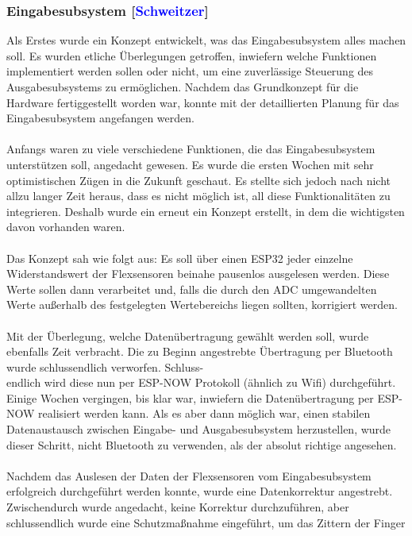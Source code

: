\documentclass[titlepage,12pt,twoside]{article}
\begin{document}
\subsubsection{Eingabesubsystem [\textcolor{blue}{Schweitzer}]}
Als Erstes wurde ein Konzept entwickelt, was das Eingabesubsystem alles machen 
soll. Es wurden etliche Überlegungen getroffen, inwiefern welche Funktionen 
implementiert werden sollen oder nicht, um eine zuverlässige Steuerung des 
Ausgabesubsystems zu ermöglichen. Nachdem das Grundkonzept für die Hardware 
fertiggestellt worden war, konnte mit der detaillierten Planung für das 
Eingabesubsystem angefangen werden. \\
\\
Anfangs waren zu viele verschiedene Funktionen, die das Eingabesubsystem 
unterstützen soll, angedacht gewesen. Es wurde die ersten Wochen mit sehr 
optimistischen Zügen in die Zukunft geschaut. Es stellte sich jedoch nach 
nicht allzu langer Zeit heraus, dass es nicht möglich ist, all diese 
Funktionalitäten zu integrieren. Deshalb wurde ein erneut ein Konzept erstellt, 
in dem die wichtigsten davon vorhanden waren. \\
\\ 
Das Konzept sah wie folgt aus: Es soll über einen ESP32 jeder einzelne 
Widerstandswert der Flexsensoren beinahe pausenlos ausgelesen werden. 
Diese Werte sollen dann verarbeitet und, falls die durch den ADC umgewandelten
Werte außerhalb des festgelegten Wertebereichs liegen sollten, korrigiert 
werden. \\
\\
Mit der Überlegung, welche Datenübertragung gewählt werden soll, wurde 
ebenfalls Zeit verbracht. Die zu Beginn angestrebte Übertragung per Bluetooth 
wurde schlussendlich verworfen. Schluss-\\endlich wird diese nun per ESP-NOW 
Protokoll (ähnlich zu Wifi) durchgeführt. Einige Wochen vergingen, bis klar 
war, inwiefern die Datenübertragung per ESP-NOW realisiert werden kann. Als 
es aber dann möglich war, einen stabilen Datenaustausch zwischen Eingabe- und 
Ausgabesubsystem herzustellen, wurde dieser Schritt, nicht Bluetooth zu 
verwenden, als der absolut richtige angesehen. \\
\\
Nachdem das Auslesen der Daten der Flexsensoren vom Eingabesubsystem 
erfolgreich durchgeführt werden konnte, wurde eine Datenkorrektur angestrebt. 
Zwischendurch wurde angedacht, keine Korrektur durchzuführen, aber 
schlussendlich wurde eine Schutzmaßnahme eingeführt, um das Zittern der Finger 
\end{document}

